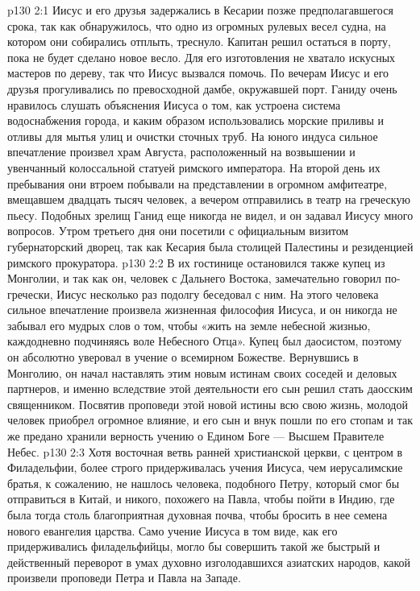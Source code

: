 \vs p130 2:1 Иисус и его друзья задержались в Кесарии позже предполагавшегося срока, так как обнаружилось, что одно из огромных рулевых весел судна, на котором они собирались отплыть, треснуло. Капитан решил остаться в порту, пока не будет сделано новое весло. Для его изготовления не хватало искусных мастеров по дереву, так что Иисус вызвался помочь. По вечерам Иисус и его друзья прогуливались по превосходной дамбе, окружавшей порт. Ганиду очень нравилось слушать объяснения Иисуса о том, как устроена система водоснабжения города, и каким образом использовались морские приливы и отливы для мытья улиц и очистки сточных труб. На юного индуса сильное впечатление произвел храм Августа, расположенный на возвышении и увенчанный колоссальной статуей римского императора. На второй день их пребывания они втроем побывали на представлении в огромном амфитеатре, вмещавшем двадцать тысяч человек, а вечером отправились в театр на греческую пьесу. Подобных зрелищ Ганид еще никогда не видел, и он задавал Иисусу много вопросов. Утром третьего дня они посетили с официальным визитом губернаторский дворец, так как Кесария была столицей Палестины и резиденцией римского прокуратора.
\vs p130 2:2 \pc В их гостинице остановился также купец из Монголии, и так как он, человек с Дальнего Востока, замечательно говорил по\hyp{}гречески, Иисус несколько раз подолгу беседовал с ним. На этого человека сильное впечатление произвела жизненная философия Иисуса, и он никогда не забывал его мудрых слов о том, чтобы «жить на земле небесной жизнью, каждодневно подчиняясь воле Небесного Отца». Купец был даосистом, поэтому он абсолютно уверовал в учение о всемирном Божестве. Вернувшись в Монголию, он начал наставлять этим новым истинам своих соседей и деловых партнеров, и именно вследствие этой деятельности его сын решил стать даосским священником. Посвятив проповеди этой новой истины всю свою жизнь, молодой человек приобрел огромное влияние, и его сын и внук пошли по его стопам и так же предано хранили верность учению о Едином Боге --- Высшем Правителе Небес.
\vs p130 2:3 Хотя восточная ветвь ранней христианской церкви, с центром в Филадельфии, более строго придерживалась учения Иисуса, чем иерусалимские братья, к сожалению, не нашлось человека, подобного Петру, который смог бы отправиться в Китай, и никого, похожего на Павла, чтобы пойти в Индию, где была тогда столь благоприятная духовная почва, чтобы бросить в нее семена нового евангелия царства. Само учение Иисуса в том виде, как его придерживались филадельфийцы, могло бы совершить такой же быстрый и действенный переворот в умах духовно изголодавшихся азиатских народов, какой произвели проповеди Петра и Павла на Западе.
